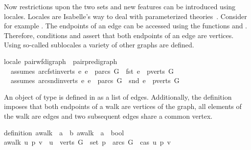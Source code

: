 \begin{isabellebody}
\begin{isamarkuptext}
Now restrictions upon the two sets and new features can be introduced using locales. 
Locales are Isabelle's way to deal with parameterized theories~\cite{ballarin2010tutorial}. Consider
for example .
The endpoints of an edge can be accessed using the functions  and . Therefore, conditions
 and  assert that both endpoints of an edge are
vertices. Using so-called sublocales a variety of other graphs are defined.  

%
\begin{isabelle}%
locale\ pair{\isacharunderscore}wf{\isacharunderscore}digraph\ {\isacharequal}\ pair{\isacharunderscore}pre{\isacharunderscore}digraph\ {\isacharplus}\isanewline
\ \ assumes\ arc{\isacharunderscore}fst{\isacharunderscore}in{\isacharunderscore}verts{\isacharcolon}\ {\isachardoublequote}{\isasymAnd}e{\isachardot}\ e\ {\isasymin}\ parcs\ G\ {\isasymLongrightarrow}\ fst\ e\ {\isasymin}\ pverts\ G{\isachardoublequote}\isanewline
\ \ assumes\ arc{\isacharunderscore}snd{\isacharunderscore}in{\isacharunderscore}verts{\isacharcolon}\ {\isachardoublequote}{\isasymAnd}e{\isachardot}\ e\ {\isasymin}\ parcs\ G\ {\isasymLongrightarrow}\ snd\ e\ {\isasymin}\ pverts\ G{\isachardoublequote}%
\end{isabelle}

An object of type  is defined in  as a list of edges. 
Additionally, the definition  imposes that both endpoints of a walk are vertices of 
the graph, all elements of the walk are edges and two subsequent edges share a common vertex. \vspace{1em}

\noindent{}

%
\begin{isabelle}%
definition\ awalk\ {\isacharcolon}{\isacharcolon}\ {\isachardoublequote}{\isacharprime}a\ {\isasymRightarrow}\ {\isacharprime}b\ awalk\ {\isasymRightarrow}\ {\isacharprime}a\ {\isasymRightarrow}\ bool{\isachardoublequote}\isanewline
{\isachardoublequote}awalk\ u\ p\ v\ {\isasymequiv}\ u\ {\isasymin}\ verts\ G\ {\isasymand}\ set\ p\ {\isasymsubseteq}\ arcs\ G\ {\isasymand}\ cas\ u\ p\ v{\isachardoublequote}\ %
\end{isabelle}


\end{isamarkuptext}
\end{isabellebody}
